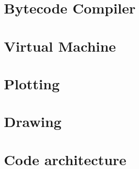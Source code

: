 \section{Bytecode Compiler}\label{sec:compiler}

\section{Virtual Machine}\label{sec:virtual-machine}

\section{Plotting}\label{sec:plotting}

\section{Drawing}\label{sec:drawing}

\section{Code architecture}\label{sec:code-architecture}